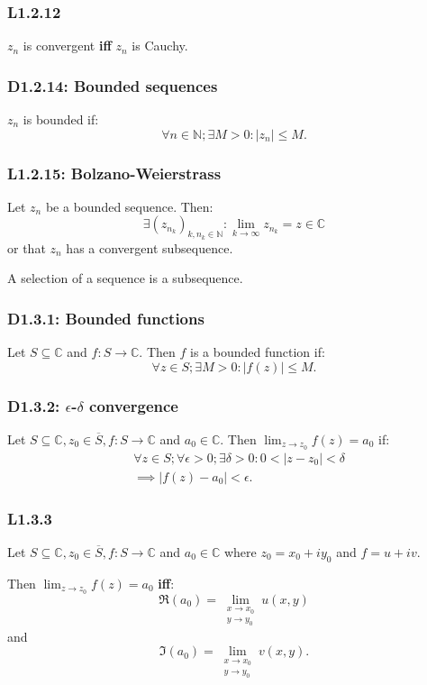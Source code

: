 \documentclass{article}
\begin{document}
\begin{multicols*}{3}
\subsubsection*{L1.2.12}
$z_n$ is convergent \textbf{if{}f} $z_n$ is Cauchy.

\subsubsection*{D1.2.14: Bounded sequences}
$z_n$ is bounded if:
$$\forall n\in\mathbb{N};\exists M>0:|z_n|\leq M.$$

\subsubsection*{L1.2.15: Bolzano-Weierstrass}
Let $z_n$ be a bounded sequence. Then:
$$\exists (z_{n_k})_{k,n_k\in\mathbb{N}}:
\lim_{k\rightarrow\infty}z_{n_k}=z\in\mathbb{C}$$
or that $z_n$ has a convergent subsequence.

A selection of a sequence is a subsequence.

\newcolumn

\subsubsection*{D1.3.1: Bounded functions}
Let $S\subseteq\mathbb{C}$ and $f:S\rightarrow\mathbb{C}$.
Then $f$ is a bounded function if:
$$\forall z\in S;\exists M>0:|f(z)|\leq M.$$

\subsubsection*{D1.3.2: $\epsilon$-$\delta$ convergence}
Let $S\subseteq\mathbb{C}, z_0\in\overline{S},f:S\rightarrow\mathbb{C}$
and $a_0\in\mathbb{C}$.
Then $\displaystyle\lim_{z\rightarrow z_0}f(z)=a_0$ if:
\begin{align*}
    &\forall z\in S;\forall\epsilon>0;\exists\delta>0:
    0<|z-z_0|<\delta \\
    &\implies|f(z)-a_0|<\epsilon.
\end{align*}

\subsubsection*{L1.3.3}
Let $S\subseteq\mathbb{C}, z_0\in\overline{S},
f:S\rightarrow\mathbb{C}$ and $a_0\in\mathbb{C}$ where $z_0=x_0+iy_0$
and $f=u+iv$.

Then $\displaystyle\lim_{z\rightarrow z_0}f(z)=a_0$ \textbf{if{}f}:
$$\Re(a_0)=\lim\limits_{\substack{
    x \to x_0 \\
    y \to y_0}}u(x,y)$$
and
$$\Im(a_0)=\lim\limits_{\substack{
    x \to x_0 \\
    y \to y_0}}v(x,y).$$


\end{multicols*}
\end{document}
